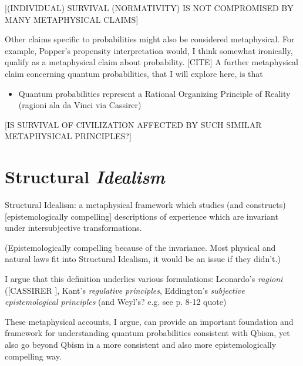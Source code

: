 [(INDIVIDUAL) SURVIVAL (NORMATIVITY) IS NOT COMPROMISED BY MANY METAPHYSICAL CLAIMS]


Other claims specific to probabilities might also be considered metaphysical.  For example, Popper's propensity interpretation would, I think somewhat ironically, qualify as a metaphysical claim about probability.  [CITE]  A further metaphysical claim concerning quantum probabilities, that I will explore here, is that 

\begin{itemize}
    \item Quantum probabilities represent a Rational Organizing Principle of Reality (ragioni ala da Vinci via Cassirer)
\end{itemize}

[IS SURVIVAL OF CIVILIZATION AFFECTED BY SUCH SIMILAR METAPHYSICAL PRINCIPLES?]




\section{Structural \emph{Idealism}}

Structural Idealism: a metaphysical framework which studies (and constructs) [epistemologically compelling] descriptions of experience which are invariant under intersubjective transformations.

(Epistemologically compelling because of the invariance.  Most physical and natural laws fit into Structural Idealism, it would be an issue if they didn't.)

I argue that this definition underlies various formulations: Leonardo's \emph{ragioni} ([CASSIRER \citep{Cassirer1927}], Kant's \emph{regulative principles}, Eddington's \emph{subjective epistemological principles} (and Weyl's? e.g. see \citep{Ryckman2005} p. 8-12 quote)

These metaphysical accounts, I argue, can provide an important foundation and framework for understanding quantum probabilities consistent with Qbism, yet also go beyond Qbism in a more consistent and also more epistemologically compelling way.



